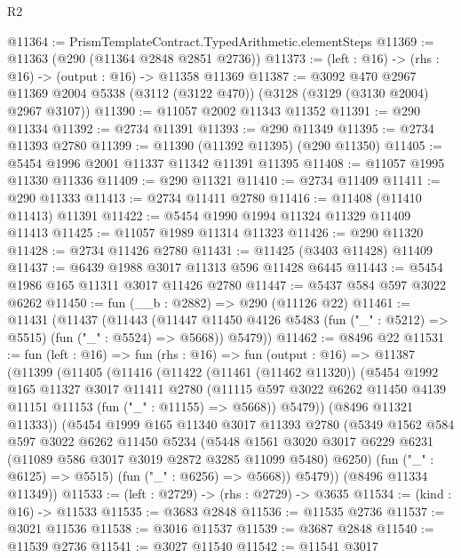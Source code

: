 \begin{lexlean}{R2}
\begin{coremodule}
@11364 := PrismTemplateContract.TypedArithmetic.elementSteps
@11369 := @11363 (@290 (@11364 @2848 @2851 @2736))
@11373 := (left : @16) -> (rhs : @16) -> (output : @16) -> @11358 @11369
@11387 := @3092
    @470
    @2967
    @11369
    @2004
    @5338
    (@3112 (@3122 @470))
    (@3128 (@3129 (@3130 @2004) @2967 @3107))
@11390 := @11057 @2002 @11343 @11352
@11391 := @290 @11334
@11392 := @2734 @11391
@11393 := @290 @11349
@11395 := @2734 @11393 @2780
@11399 := @11390 (@11392 @11395) (@290 @11350)
@11405 := @5454 @1996 @2001 @11337 @11342 @11391 @11395
@11408 := @11057 @1995 @11330 @11336
@11409 := @290 @11321
@11410 := @2734 @11409
@11411 := @290 @11333
@11413 := @2734 @11411 @2780
@11416 := @11408 (@11410 @11413) @11391
@11422 := @5454 @1990 @1994 @11324 @11329 @11409 @11413
@11425 := @11057 @1989 @11314 @11323
@11426 := @290 @11320
@11428 := @2734 @11426 @2780
@11431 := @11425 (@3403 @11428) @11409
@11437 := @6439 @1988 @3017 @11313 @596 @11428 @6445
@11443 := @5454 @1986 @165 @11311 @3017 @11426 @2780
@11447 := @5437 @584 @597 @3022 @6262
@11450 := fun (__b : @2882) => @290 (@11126 @22)
@11461 := @11431
    (@11437
      (@11443
        (@11447 @11450 @4126 @5483 (fun ("_" : @5212) => @5515) (fun ("_" : @5524) => @5668))
        @5479))
@11462 := @8496 @22
@11531 := fun (left : @16) =>
  fun (rhs : @16) =>
  fun (output : @16) =>
  @11387
    (@11399
      (@11405
        (@11416
          (@11422
            (@11461 (@11462 @11320))
            (@5454
              @1992
              @165
              @11327
              @3017
              @11411
              @2780
              (@11115 @597 @3022 @6262 @11450 @4139 @11151 @11153 (fun ("_" : @11155) => @5668))
              @5479))
          (@8496 @11321 @11333))
        (@5454
          @1999
          @165
          @11340
          @3017
          @11393
          @2780
          (@5349
            @1562
            @584
            @597
            @3022
            @6262
            @11450
            @5234
            (@5448
              @1561
              @3020
              @3017
              @6229
              @6231
              (@11089 @586 @3017 @3019 @2872 @3285 @11099 @5480)
              @6250)
            (fun ("_" : @6125) => @5515)
            (fun ("_" : @6256) => @5668))
          @5479))
      (@8496 @11334 @11349))
@11533 := (left : @2729) -> (rhs : @2729) -> @3635
@11534 := (kind : @16) -> @11533
@11535 := @3683 @2848
@11536 := @11535 @2736
@11537 := @3021 @11536
@11538 := @3016 @11537
@11539 := @3687 @2848
@11540 := @11539 @2736
@11541 := @3027 @11540
@11542 := @11541 @3017

\end{coremodule}
\end{lexlean}
